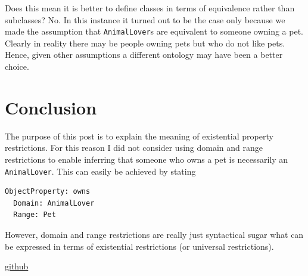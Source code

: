 \documentclass{amsart}
\begin{document}
Does this mean it is better to define classes in terms of equivalence rather than subclasses? No. In this instance it turned out to be the case only because we made the assumption that \texttt{AnimalLover}s are equivalent to someone owning a pet. Clearly in reality there may be people owning pets but who do not like pets. Hence, given other assumptions a different ontology may have been a better choice.

  \section{Conclusion}
The purpose of this post is to explain the meaning of existential property restrictions. For this reason I did not consider using domain and range restrictions to enable inferring that someone who owns a pet is necessarily an \texttt{AnimalLover}. This can easily be achieved by stating 
\begin{small}
\begin{verbatim} 
ObjectProperty: owns
  Domain: AnimalLover
  Range: Pet
\end{verbatim}
\end{small}  
However, domain and range restrictions are really just syntactical sugar what can be expressed in terms of existential restrictions (or universal restrictions).  
 
\href{http://}{github}	

  
  
 
\end{document}
